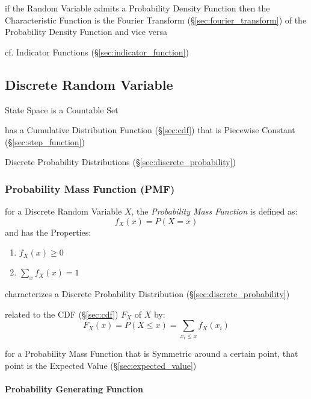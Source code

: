 if the Random Variable admits a Probability Density Function then the
Characteristic Function is the Fourier Transform (\S\ref{sec:fourier_transform})
of the Probability Density Function and vice versa

\fist cf. Indicator Functions (\S\ref{sec:indicator_function})



\subsection{Discrete Random Variable}\label{sec:discrete_random_variable}

State Space is a Countable Set

has a Cumulative Distribution Function (\S\ref{sec:cdf}) that is Piecewise
Constant (\S\ref{sec:step_function})

\fist Discrete Probability Distributions (\S\ref{sec:discrete_probability})



\subsubsection{Probability Mass Function (PMF)}\label{sec:pmf}

for a Discrete Random Variable $X$, the \emph{Probability Mass Function} is
defined as:
\[
  f_X(x) = P(X = x)
\]
and has the Properties:
\begin{enumerate}
  \item $f_X(x) \geq 0$
  \item $\sum_x f_X(x) = 1$
\end{enumerate}

characterizes a Discrete Probability Distribution
(\S\ref{sec:discrete_probability})

related to the CDF (\S\ref{sec:cdf}) $F_X$ of $X$ by:
\[
  F_X(x) = P(X \leq x) = \sum_{x_i \leq x} f_X(x_i)
\]

for a Probability Mass Function that is Symmetric around a certain point, that
point is the Expected Value (\S\ref{sec:expected_value})



\paragraph{Probability Generating Function}
\label{sec:probability_generating_function}\hfill

